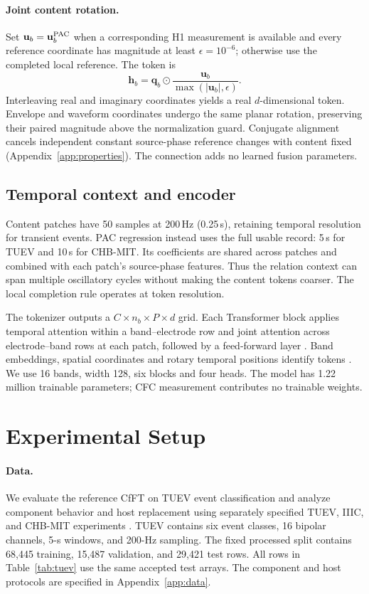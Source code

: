 \documentclass[10pt,twocolumn,letterpaper]{article}
\begin{document}
\paragraph{Joint content rotation.}
Set $\mathbf u_b=\mathbf u_b^{\rm PAC}$ when a corresponding H1
measurement is available and every reference coordinate has magnitude
at least $\epsilon=10^{-6}$; otherwise use the completed local reference.
The token is
\begin{equation}
\mathbf h_b=\mathbf q_b\odot
\frac{\mathbf u_b}{\max(|\mathbf u_b|,\epsilon)}.
\label{eq:token}
\end{equation}
Interleaving real and imaginary coordinates yields a real
$d$-dimensional token. Envelope and waveform coordinates undergo the
same planar rotation, preserving their paired magnitude above the
normalization guard. Conjugate alignment cancels independent constant
source-phase reference changes with content fixed
(Appendix~\ref{app:properties}). The connection adds no learned fusion
parameters.

\subsection{Temporal context and encoder}
\label{sec:encoder}
Content patches have 50 samples at 200\,Hz (0.25\,s), retaining temporal
resolution for transient events. PAC regression instead uses the full
usable record: 5\,s for TUEV and 10\,s for CHB-MIT. Its coefficients
are shared across patches and combined with each patch's source-phase
features. Thus the relation context can span multiple oscillatory cycles
without making the content tokens coarser. The local completion rule
operates at token resolution.

The tokenizer outputs a $C\times n_b\times P\times d$ grid. Each
Transformer block applies temporal attention within a band--electrode
row and joint attention across electrode--band rows at each patch,
followed by a feed-forward layer \citep{vaswani2017attention}.
Band embeddings, spatial coordinates and rotary temporal positions
identify tokens \citep{su2024roformer}. We use 16 bands, width 128,
six blocks and four heads. The model has 1.22 million trainable
parameters; CFC measurement contributes no trainable weights.

\section{Experimental Setup}
\label{sec:setup}
\paragraph{Data.}
We evaluate the reference CfFT on TUEV event classification and analyze
component behavior and host replacement using separately specified
TUEV, IIIC, and CHB-MIT experiments
\citep{obeid2016temple,jing2023development,shoeb2009application}.
TUEV contains six event classes,
16 bipolar channels, 5-s windows, and 200-Hz sampling. The fixed processed
split contains 68,445 training, 15,487 validation, and 29,421 test rows.
All rows in Table~\ref{tab:tuev} use the same accepted test arrays.
The component and host protocols are specified in Appendix~\ref{app:data}.
\end{document}
